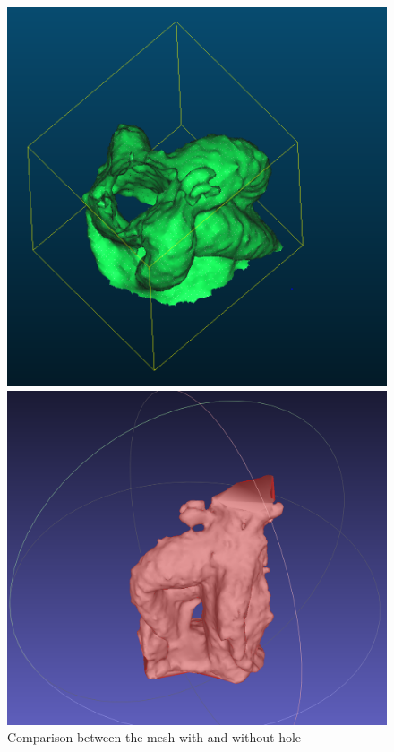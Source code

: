 \documentclass[runningheads,a4paper]{llncs}
\begin{document}
\begin{figure}
\begin{minipage}{.5\textwidth}
  \includegraphics[width=0.9\linewidth]{meshwithhole.PNG}
\end{minipage}
\begin{minipage}{.5\textwidth}
  \centering
  \includegraphics[width=0.9\linewidth]{Closed_hole.PNG}
\end{minipage}
\caption{Comparison between the mesh with and without hole}
\label{fig:mesh-hole}
\end{figure}
\end{document}
